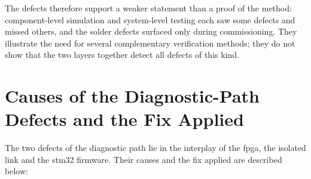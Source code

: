 The defects therefore support a weaker statement than a proof of the method: component-level simulation and system-level testing each saw some defects and missed others, and the solder defects surfaced only during commissioning. They illustrate the need for several complementary verification methods; they do not show that the two layers together detect all defects of this kind.

\section{Causes of the Diagnostic-Path Defects and the Fix Applied}
\label{sec:diagnostic_resolution}

The two defects of the diagnostic path lie in the interplay of the \gls{fpga}, the isolated link and the \gls{stm32} firmware. Their causes and the fix applied are described below:
